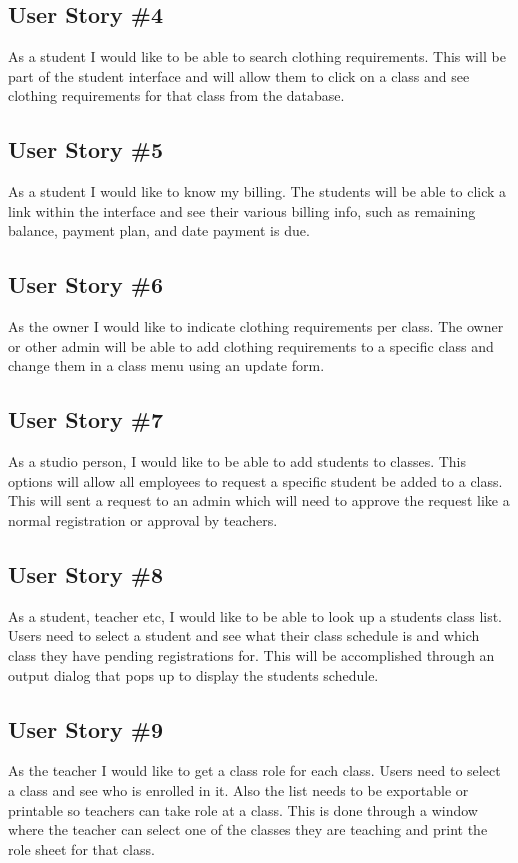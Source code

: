 \subsection{User Story \#4}
As a student I would like to be able to search clothing requirements. This will be part of the student interface and will allow them to click on a class and see clothing requirements for that class from the database.

\subsection{User Story \#5}
As a student I would like to know my billing. The students will be able to click a link within the interface and see their various billing info, such as remaining balance, payment plan, and date payment is due.

\subsection{User Story \#6}
As the owner I would like to indicate clothing requirements per class. The owner or other admin will be able to add clothing requirements to a specific class and change them in a class menu using an update form.


\subsection{User Story \#7}
As a studio person, I would like to be able to add students to classes. This options will allow all employees to request a specific student be added to a class. This will sent a request to an admin which will need to approve the request like a normal registration or approval by teachers.

\subsection{User Story \#8}
As a student, teacher etc, I would like to be able to look up a students class list. Users need to select a student and see what their class schedule is and which class they have pending registrations for. This will be accomplished through an output dialog that pops up to display the students schedule.


\subsection{User Story \#9}
As the teacher I would like to get a class role for each class. Users need to select a class and see who is enrolled in it. Also the list needs to be exportable or printable so teachers can take role at a class. This is done through a window where the teacher can select one of the classes they are teaching and print the role sheet for that class.

